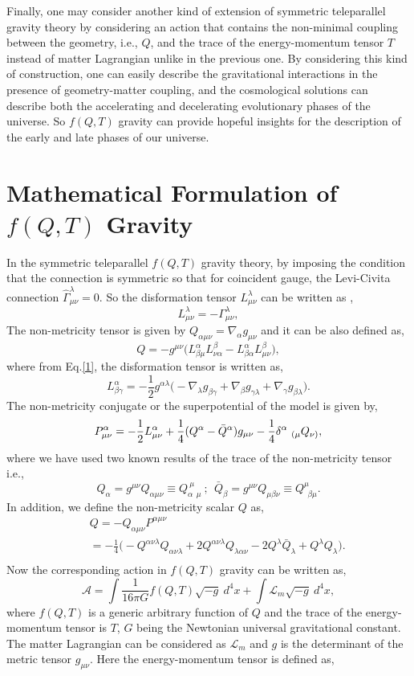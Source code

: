 \documentclass[aps,prd,showpacs,nofootinbib,floats,floatfix,preprintnumbers,groupedaddress,twocolumn]{revtex4-1}
\def \m{\mu}
\def \n{\nu}
\def \a{\alpha}
\def \b{\beta}
\def \g{\gamma}
\def \d{\delta}
\def \l{\lambda}
\def \s{\sqrt}
\def \be{\begin{equation}}
\def \ee{\end{equation}}
\def \ben{\begin{eqnarray}}
\def \een{\end{eqnarray}}
\def \nb{\nabla}
\def \L{\mathcal{L}_m}
\def \A{\mathcal{A}}
\def \G{\Gamma}
\def \non{\nonumber}
\begin{document}
    Finally, one may consider another kind of extension of symmetric teleparallel gravity theory by considering an action that contains the non-minimal coupling between the geometry, i.e., $Q$, and the trace of the energy-momentum tensor $T$ instead of matter Lagrangian unlike in the previous one. By considering this kind of construction, one can easily describe the gravitational interactions in the presence of geometry-matter coupling, and the cosmological solutions can describe both the accelerating and decelerating evolutionary phases of the universe. So $f(Q,T)$ gravity can provide hopeful insights for the description of the early and late phases of our universe.



    
\section{Mathematical Formulation of $f(Q,T)$ Gravity}\label{III}
\noindent
    In the symmetric teleparallel $f(Q,T)$ gravity theory, by imposing the condition that the connection is symmetric so that for coincident gauge, the Levi-Civita connection $\hat{\G}^\l_{\m\n}=0$. So the disformation tensor $L^\l_{\m\n}$ can be written as \cite{epjc},
\be
    L^\l_{\m\n}=-\G^\l_{\m\n}\label{1},
\ee
    The non-metricity tensor is given by $Q_{\a\m\n}=\nb_\a g_{\m\n}$ and it can be also defined as,
\be
    Q=-g^{\m\n}\Big(L^\a_{\b\m}L^\b_{\n\a}-L^\a_{\b\a}L^\b_{\m\n}\Big)\label{2},
\ee
    where from Eq.\eqref{1}, the disformation tensor is written as,
\be
    L^\a_{\b\g}=-\frac{1}{2}g^{\a\l}\Big(-\nb_\l g_{\b\g}+\nb_\b g_{\g\l}+\nb_\g g_{\b\l}\Big).\label{3}
\ee
    The non-metricity conjugate or the superpotential of the model is given by,
\be
    P^\a_{\m\n}=-\frac{1}{2}L^\a_{\m\n}+\frac{1}{4}(Q^\a-\Bar{Q}^\a)g_{\m\n}-\frac{1}{4}\d^\a~_{(\m}Q_{\n)},\label{4}
\ee
    where we have used two known results of the trace of the non-metricity tensor i.e.,
\be
    Q_\a=g^{\m\n}Q_{\a\m\n}\equiv Q^{~\m~}_{\a~~\m}~;~~
    \bar{Q}_\b=g^{\m\n}Q_{\m\b\n}\equiv Q^{\m}_{~~\b\m}.\label{5}
\ee
    In addition, we define the non-metricity scalar $Q$ as,
\ben
    &&Q=-Q_{\a\m\n}P^{\a\m\n}\non\\
    &&=-\frac{1}{4}\Big(-Q^{\a\n\l} Q_{\a\n\l}+2 Q^{\a\n\l}Q_{\l\a\n}
    -2 Q^\l\bar{Q}_\l+Q^\l Q_\l\Big).\non\\
    \label{6}  
\een
    Now the corresponding action in $f(Q,T)$ gravity can be written as,
\be
    \A=\int \frac{1}{16\pi G}f(Q,T)\s{-g}~d^4x+\int \L\s{-g}~d^4x\label{7},
\ee
    where $f(Q,T)$ is a generic arbitrary function of $Q$ and the trace of the energy-momentum tensor is $T$, $G$ being the Newtonian universal gravitational constant. The matter Lagrangian can be considered as $\L$ and $g$ is the determinant of the metric tensor $g_{\m\n}$. Here the energy-momentum tensor is defined as,
\end{document}
